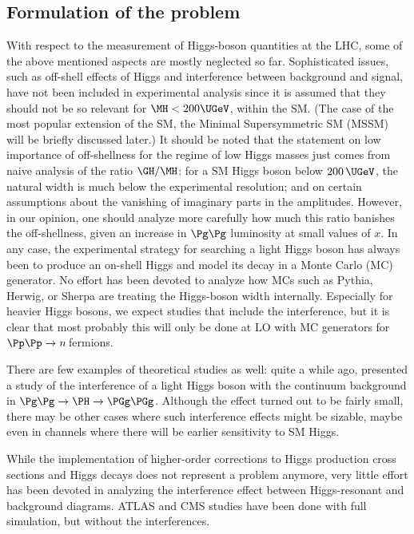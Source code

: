 \subsection{Formulation of the problem}
With respect to the measurement of Higgs-boson quantities at the LHC, 
some of the above mentioned aspects are mostly neglected so far.
Sophisticated issues, such as off-shell effects of Higgs and interference 
between background and signal, have not been included in experimental
analysis since 
it is assumed that they should not be so relevant for $\MH < 200\UGeV$,
within the SM. (The case of the most popular extension of the SM, the
Minimal Supersymmetric SM (MSSM) will be briefly discussed later.)
It should be noted that the statement on low importance of off-shellness for
the regime of low Higgs masses just comes from naive analysis of the
ratio $\GH/\MH$: for a SM Higgs boson below $200\,\UGeV$, the natural 
width is much below the experimental resolution; and on certain
assumptions about the vanishing of imaginary parts in the amplitudes.
However, in our opinion, one 
should analyze more carefully how much this ratio banishes the off-shellness, 
given an increase in $\Pg\Pg$ luminosity at small values of $x$.
In any case, the experimental strategy for searching a light Higgs boson 
has always been to produce an on-shell Higgs and model its decay in a
Monte Carlo (MC) generator.
No effort has been devoted to analyze how MCs such as {\sc Pythia}, 
{\sc Herwig},
or {\sc Sherpa} are treating the Higgs-boson width internally. Especially for 
heavier Higgs bosons, we expect studies that include the interference, but it is clear 
that most probably this will only be done at LO with MC generators for 
$\Pp \Pp \to n\,$fermions. 

There are few examples of theoretical studies as well: quite a while ago, 
 presented a study of the interference of a light 
Higgs boson with the continuum background in $\Pg\Pg \to \PH \to \PGg \PGg$. 
Although the effect turned out to be fairly small, there may be other cases 
where such interference effects might be sizable, maybe even in channels 
where there will be earlier sensitivity to SM Higgs.

While the implementation of higher-order corrections to Higgs production 
cross sections and Higgs decays does not represent a problem anymore, very
little effort has been devoted in analyzing the interference effect 
between Higgs-resonant and background diagrams. ATLAS and CMS studies have been 
done with full simulation, but without the interferences.

